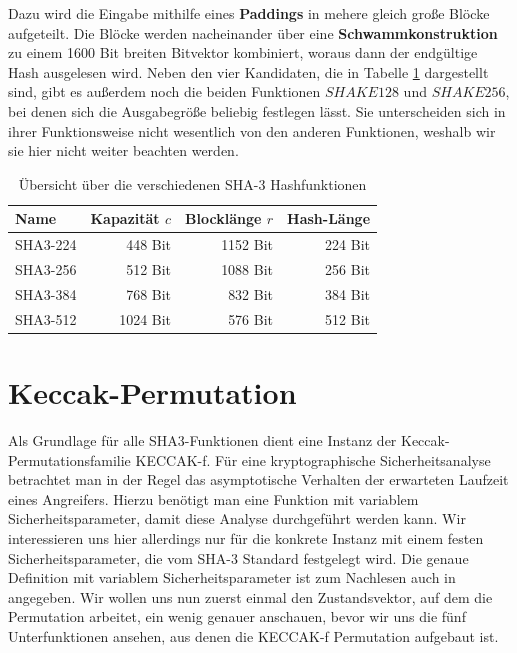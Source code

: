 Dazu wird die Eingabe mithilfe eines \textbf{Paddings} in mehere gleich große Blöcke aufgeteilt. Die Blöcke werden nacheinander über eine \textbf{Schwammkonstruktion}
zu einem 1600 Bit breiten Bitvektor kombiniert, woraus dann der endgültige Hash ausgelesen wird. Neben den vier Kandidaten, die in Tabelle \ref{tab:uebersicht_sha3} dargestellt sind,
gibt es außerdem noch die beiden Funktionen $SHAKE128$ und $SHAKE256$, bei denen sich die Ausgabegröße beliebig festlegen lässt.
Sie unterscheiden sich in ihrer Funktionsweise nicht wesentlich von den anderen Funktionen, weshalb wir sie hier nicht weiter beachten werden.
\begin{table}
	\centering
	\begin{tabular}{lrrr}
		Name & Kapazität $c$ & Blocklänge $r$ & Hash-Länge \\
		\hline
		SHA3-224 & 448 Bit & 1152 Bit & 224 Bit \\
		SHA3-256 & 512 Bit & 1088 Bit & 256 Bit \\
		SHA3-384 & 768 Bit & 832 Bit & 384 Bit \\
		SHA3-512 & 1024 Bit & 576 Bit & 512 Bit
	\end{tabular}
	\caption{Übersicht über die verschiedenen SHA-3 Hashfunktionen}
	\label{tab:uebersicht_sha3}
\end{table}

\newcommand{\bigcomp}{%
  \DOTSB
  \mathop{\vphantom{\sum}\mathpalette\bigcomp@\relax}%
  \slimits@
}
\newcommand{\bigcomp@}[2]{%
  \begingroup\m@th
  \sbox\z@{$#1\sum$}%
  \setlength{\unitlength}{0.9\dimexpr\ht\z@+\dp\z@}%
  \vcenter{\hbox{%
    \begin{picture}(1,1)
    \bigcomp@linethickness{#1}
    \put(0.5,0.5){\circle{1}}
    \end{picture}%
  }}%
  \endgroup
}
\newcommand{\bigcomp@linethickness}[1]{%
  \linethickness{%
      \ifx#1\displaystyle 2\fontdimen8\textfont\else
      \ifx#1\textstyle 1.65\fontdimen8\textfont\else
      \ifx#1\scriptstyle 1.65\fontdimen8\scriptfont\else
      1.65\fontdimen8\scriptscriptfont\fi\fi\fi 3
  }%
}

\section{Keccak-Permutation}
Als Grundlage für alle SHA3-Funktionen dient eine Instanz der Keccak-Permutationsfamilie KECCAK-f.
Für eine kryptographische Sicherheitsanalyse betrachtet man in der Regel das asymptotische Verhalten der erwarteten Laufzeit eines Angreifers.
Hierzu benötigt man eine Funktion mit variablem Sicherheitsparameter, damit diese Analyse durchgeführt werden kann.
Wir interessieren uns hier allerdings nur für die konkrete Instanz mit einem festen Sicherheitsparameter, die vom SHA-3 Standard  festgelegt wird.
Die genaue Definition mit variablem Sicherheitsparameter ist zum Nachlesen auch in  angegeben.
Wir wollen uns nun zuerst einmal den Zustandsvektor, auf dem die Permutation arbeitet, ein wenig genauer anschauen,
bevor wir uns die fünf Unterfunktionen ansehen, aus denen die KECCAK-f Permutation aufgebaut ist.

